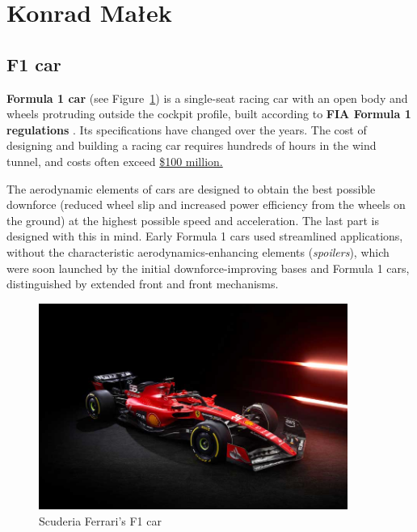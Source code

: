 \section{Konrad Małek}
\label{sec:konradmalek}

\subsection*{F1 car}

\label{sub:f1}


\textbf{Formula 1 car} (see Figure~\ref{fig:bolid}) is a single-seat racing car with an open body and wheels protruding outside the cockpit profile, built according to \textbf{FIA Formula 1 regulations }. Its specifications have changed over the years. The cost of designing and building a racing car requires hundreds of hours in the wind tunnel, and costs often exceed \underline{\$100 million.}\par
The aerodynamic elements of cars are designed to obtain the best possible downforce (reduced wheel slip and increased power efficiency from the wheels on the ground) at the highest possible speed and acceleration. The last part is designed with this in mind. Early Formula 1 cars used streamlined applications, without the characteristic aerodynamics-enhancing elements (\textit{spoilers}), which were soon launched by the initial downforce-improving bases and Formula 1 cars, distinguished by extended front and front mechanisms.

\vspace{5mm}
\begin{figure}[h] 
    \centering
    \includegraphics[width=0.9\textwidth]{pictures/bolid_f1.jpg} 
    \caption{Scuderia Ferrari's F1 car }
    \label{fig:bolid}
\end{figure}


